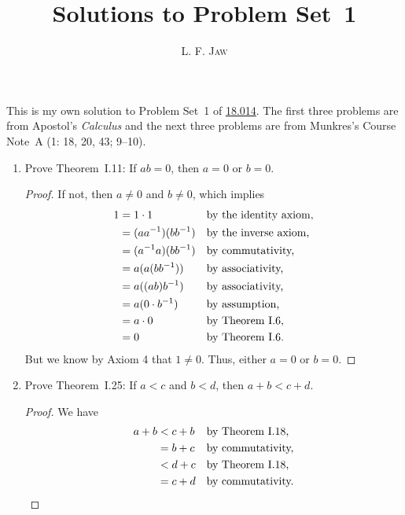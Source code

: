 \documentclass[a4paper]{article}
\title{Solutions to Problem Set~1}
\author{L. F. \textsc{Jaw}}
\begin{document}
\maketitle

This is my own solution to Problem Set~1 of
\href{https://ocw.mit.edu/courses/mathematics/18-014-calculus-with-theory-fall-2010/assignments/}{18.014}.
The first three problems are from Apostol's \textit{Calculus} and the next
three problems are from Munkres's Course Note~A (1: 18, 20, 43; 9--10).

\begin{enumerate}
\item Prove Theorem~I.11: If \(ab=0\), then \(a=0\) or \(b=0\).

  \begin{proof}
    If not, then \(a \ne 0\) and \(b \ne 0\), which implies
    \begin{align*}
      1 &= 1 \cdot 1           && \text{by the identity axiom,} \\
        &= (aa^{-1}) (bb^{-1}) && \text{by the inverse axiom,} \\
        &= (a^{-1}a) (bb^{-1}) && \text{by commutativity,} \\
        &= a (a(bb^{-1}))      && \text{by associativity,} \\
        &= a ((ab)b^{-1})      && \text{by associativity,} \\
        &= a (0 \cdot b^{-1})  && \text{by assumption,} \\
        &= a \cdot 0           && \text{by Theorem~I.6,} \\
        &= 0                   && \text{by Theorem~I.6.}
    \end{align*}
    But we know by Axiom 4 that \(1 \ne 0\).  Thus, either \(a = 0\) or
    \(b = 0\).
  \end{proof}

\item Prove Theorem~I.25: If \(a < c\) and \(b < d\), then \(a+b < c+d\).

  \begin{proof}
    We have
    \begin{align*}
      a + b &< c + b && \text{by Theorem~I.18,} \\
            &= b + c && \text{by commutativity,} \\
            &< d + c && \text{by Theorem~I.18,} \\
            &= c + d && \text{by commutativity.} \qedhere
    \end{align*}
  \end{proof}


\end{enumerate}
\end{document}
